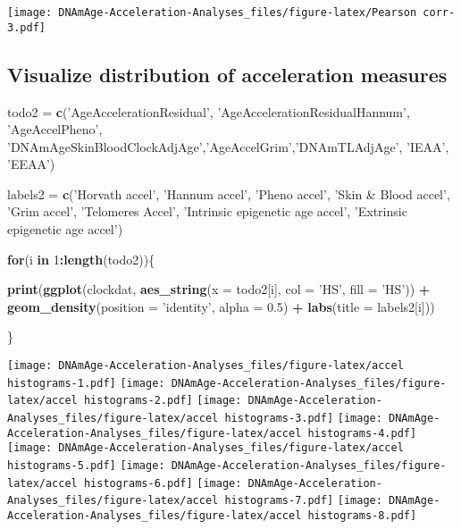 \documentclass[]{article}
\newenvironment{Shaded}{\begin{snugshade}}{\end{snugshade}}
\newcommand{\KeywordTok}[1]{\textcolor[rgb]{0.13,0.29,0.53}{\textbf{#1}}}
\newcommand{\DataTypeTok}[1]{\textcolor[rgb]{0.13,0.29,0.53}{#1}}
\newcommand{\DecValTok}[1]{\textcolor[rgb]{0.00,0.00,0.81}{#1}}
\newcommand{\FloatTok}[1]{\textcolor[rgb]{0.00,0.00,0.81}{#1}}
\newcommand{\StringTok}[1]{\textcolor[rgb]{0.31,0.60,0.02}{#1}}
\newcommand{\ControlFlowTok}[1]{\textcolor[rgb]{0.13,0.29,0.53}{\textbf{#1}}}
\newcommand{\OperatorTok}[1]{\textcolor[rgb]{0.81,0.36,0.00}{\textbf{#1}}}
\newcommand{\NormalTok}[1]{#1}
\begin{document}
\texttt{[image: DNAmAge-Acceleration-Analyses\_files/figure-latex/Pearson corr-3.pdf]}

\subsection{Visualize distribution of acceleration
measures}\label{visualize-distribution-of-acceleration-measures}

\begin{Shaded}
\begin{Highlighting}[]
\NormalTok{todo2 =}\StringTok{ }\KeywordTok{c}\NormalTok{(}\StringTok{'AgeAccelerationResidual'}\NormalTok{,}
        \StringTok{'AgeAccelerationResidualHannum'}\NormalTok{,}
        \StringTok{'AgeAccelPheno'}\NormalTok{,}
        \StringTok{'DNAmAgeSkinBloodClockAdjAge'}\NormalTok{,}\StringTok{'AgeAccelGrim'}\NormalTok{,}\StringTok{'DNAmTLAdjAge'}\NormalTok{,}
        \StringTok{'IEAA'}\NormalTok{, }\StringTok{'EEAA'}\NormalTok{)}

\NormalTok{labels2 =}\StringTok{ }\KeywordTok{c}\NormalTok{(}\StringTok{'Horvath accel'}\NormalTok{, }\StringTok{'Hannum accel'}\NormalTok{, }\StringTok{'Pheno accel'}\NormalTok{, }\StringTok{'Skin & Blood accel'}\NormalTok{, }
            \StringTok{'Grim accel'}\NormalTok{, }\StringTok{'Telomeres Accel'}\NormalTok{, }\StringTok{'Intrinsic epigenetic age accel'}\NormalTok{,}
            \StringTok{'Extrinsic epigenetic age accel'}\NormalTok{)}

\ControlFlowTok{for}\NormalTok{(i }\ControlFlowTok{in} \DecValTok{1}\OperatorTok{:}\KeywordTok{length}\NormalTok{(todo2))\{}
  
  \KeywordTok{print}\NormalTok{(}\KeywordTok{ggplot}\NormalTok{(clockdat, }\KeywordTok{aes_string}\NormalTok{(}\DataTypeTok{x =}\NormalTok{ todo2[i], }\DataTypeTok{col =} \StringTok{'HS'}\NormalTok{, }\DataTypeTok{fill =} \StringTok{'HS'}\NormalTok{)) }\OperatorTok{+}\StringTok{ }
\StringTok{  }\KeywordTok{geom_density}\NormalTok{(}\DataTypeTok{position =} \StringTok{'identity'}\NormalTok{, }\DataTypeTok{alpha =} \FloatTok{0.5}\NormalTok{) }\OperatorTok{+}
\StringTok{  }\KeywordTok{labs}\NormalTok{(}\DataTypeTok{title =}\NormalTok{ labels2[i]))}

\NormalTok{\}}
\end{Highlighting}
\end{Shaded}

\texttt{[image: DNAmAge-Acceleration-Analyses\_files/figure-latex/accel histograms-1.pdf]}
\texttt{[image: DNAmAge-Acceleration-Analyses\_files/figure-latex/accel histograms-2.pdf]}
\texttt{[image: DNAmAge-Acceleration-Analyses\_files/figure-latex/accel histograms-3.pdf]}
\texttt{[image: DNAmAge-Acceleration-Analyses\_files/figure-latex/accel histograms-4.pdf]}
\texttt{[image: DNAmAge-Acceleration-Analyses\_files/figure-latex/accel histograms-5.pdf]}
\texttt{[image: DNAmAge-Acceleration-Analyses\_files/figure-latex/accel histograms-6.pdf]}
\texttt{[image: DNAmAge-Acceleration-Analyses\_files/figure-latex/accel histograms-7.pdf]}
\texttt{[image: DNAmAge-Acceleration-Analyses\_files/figure-latex/accel histograms-8.pdf]}
\end{document}
